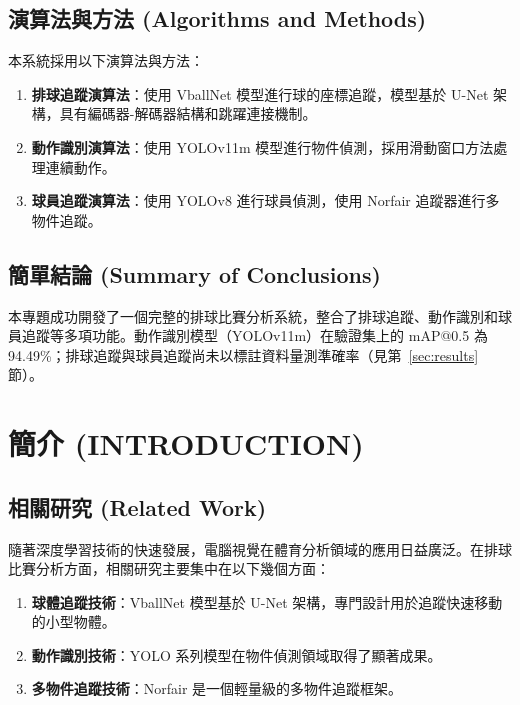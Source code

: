 \documentclass[a4paper,14pt,oneside]{article}
\begin{document}
\subsection{演算法與方法 (Algorithms and Methods)}
本系統採用以下演算法與方法：

\begin{enumerate}
    \item \textbf{排球追蹤演算法}：使用 VballNet 模型進行球的座標追蹤，模型基於 U-Net 架構，具有編碼器-解碼器結構和跳躍連接機制。
    
    \item \textbf{動作識別演算法}：使用 YOLOv11m 模型進行物件偵測，採用滑動窗口方法處理連續動作。
    
    \item \textbf{球員追蹤演算法}：使用 YOLOv8 進行球員偵測，使用 Norfair 追蹤器進行多物件追蹤。
\end{enumerate}

\subsection{簡單結論 (Summary of Conclusions)}
本專題成功開發了一個完整的排球比賽分析系統，整合了排球追蹤、動作識別和球員追蹤等多項功能。動作識別模型（YOLOv11m）在驗證集上的 mAP@0.5 為 94.49\%；排球追蹤與球員追蹤尚未以標註資料量測準確率（見第~\ref{sec:results} 節）。

\newpage
\section{簡介 (INTRODUCTION)}

\subsection{相關研究 (Related Work)}
隨著深度學習技術的快速發展，電腦視覺在體育分析領域的應用日益廣泛。在排球比賽分析方面，相關研究主要集中在以下幾個方面：

\begin{enumerate}
    \item \textbf{球體追蹤技術}：VballNet 模型基於 U-Net 架構，專門設計用於追蹤快速移動的小型物體。
    
    \item \textbf{動作識別技術}：YOLO 系列模型在物件偵測領域取得了顯著成果。
    
    \item \textbf{多物件追蹤技術}：Norfair 是一個輕量級的多物件追蹤框架。
\end{enumerate}
\end{document}

